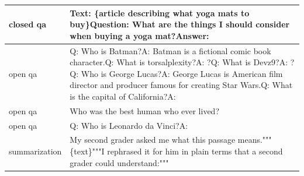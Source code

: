 \documentclass{article}
\begin{document}
\begin{longtable}{p{} p{}}
     closed qa &                                                                                                                                                        Text: {\newline}\{article describing what yoga mats to buy\}{\newline}{\newline}Question: What are the things I should consider when buying a yoga mat?{\newline}Answer:  \\ \midrule
       open qa & Q: Who is Batman?{\newline}A: Batman is a fictional comic book character.{\newline}{\newline}Q: What is torsalplexity?{\newline}A: ?{\newline}{\newline}Q: What is Devz9?{\newline}A: ?{\newline}{\newline}Q: Who is George Lucas?{\newline}A: George Lucas is American film director and producer famous for creating Star Wars.{\newline}{\newline}Q: What is the capital of California?{\newline}A: \\ \midrule
       open qa &                                                                                                                                                                                                                                                         Who was the best human who ever lived? \\ \midrule
       open qa &                                                                                                                                                                                                                                                               Q: Who is Leonardo da Vinci?{\newline}A: \\ \midrule
 summarization &                                                                                                                                        My second grader asked me what this passage means.{\newline}"""{\newline}\{text\}{\newline}"""{\newline}I rephrased it for him in plain terms that a second grader could understand:{\newline}""" \\ \midrule

\end{longtable}
\end{document}

